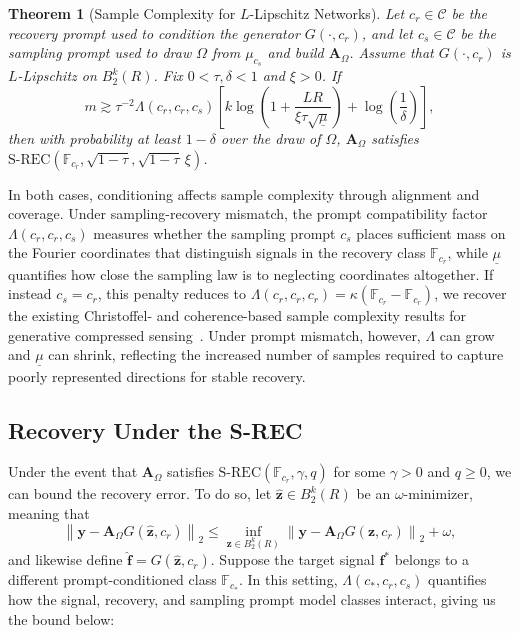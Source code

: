 \documentclass{article}
\theoremstyle{plain}
\newtheorem{theorem}{Theorem}[section]
\theoremstyle{definition}
\theoremstyle{remark}
\begin{document}
\begin{theorem}[Sample Complexity for $L$-Lipschitz Networks]
  \label{thm:lipschitz-srec}
  Let $c_r\in\mathcal C$ be the recovery prompt used to condition the generator $G(\cdot, c_r)$, and let $c_s\in\mathcal C$ be the sampling prompt used to draw $\Omega$ from $\mu_{c_s}$ and build $\mathbf A_\Omega$.
  Assume that $G\left(\cdot,c_r\right)$ is $L$-Lipschitz on $B_2^k\left(R\right)$. Fix $0<\tau,\delta<1$ and $\xi>0$. If
  \[
    m
    \gtrsim
    \tau^{-2}
    \Lambda\left(c_r,c_r,c_s\right)
    \left[
      k\log\left(
        1+
        \frac{LR}
        {\xi\tau\sqrt{\underline{\mu}}}
      \right)
      +
      \log\left(\frac{1}{\delta}\right)
    \right],
  \]
  then with probability at least $1-\delta$ over the draw of $\Omega$, $\mathbf A_\Omega$ satisfies
  $
  \mathrm{S\text{-}REC}
  \left(
    \mathbb{F}_{c_r},
    \sqrt{1-\tau},
    \sqrt{1-\tau}\,\xi
  \right)
  $.
\end{theorem}

In both cases, conditioning affects sample complexity through alignment and coverage. Under sampling-recovery mismatch, the prompt compatibility factor $\Lambda(c_r,c_r,c_s)$ measures whether the sampling prompt $c_s$ places sufficient mass on the Fourier coordinates that distinguish signals in the recovery class $\mathbb F_{c_r}$, while $\underline{\mu}$ quantifies how close the sampling law is to neglecting coordinates altogether. If instead $c_s=c_r$, this penalty reduces to $\Lambda(c_r,c_r,c_r)=\kappa(\mathbb F_{c_r}-\mathbb F_{c_r})$, we recover the existing Christoffel- and coherence-based sample complexity results for generative compressed sensing~\cite{adcock2023cs4ml, berk2023modeladapted, plan2025denoising}. Under prompt mismatch, however, $\Lambda$ can grow and $\underline{\mu}$ can shrink, reflecting the increased number of samples required to capture poorly represented directions for stable recovery.


\subsection{Recovery Under the S-REC}\label{subsec:recovery}
Under the event that $\mathbf A_\Omega$ satisfies
$\mathrm{S\text{-}REC}\left(\mathbb{F}_{c_r},\gamma,q\right)$
for some $\gamma>0$ and $q\geq 0$, we can bound the recovery error. To do so, let $\widehat{\mathbf z}\in B_2^k(R)$ be an $\omega$-minimizer, meaning that
\begin{equation}\label{eq: omega minimizer}
  \left\|
  \mathbf y
  -
  \mathbf A_\Omega G\left(\widehat{\mathbf z},c_r\right)
  \right\|_2
  \le
  \inf_{\mathbf z\in B_2^k(R)}
  \left\|
  \mathbf y
  -
  \mathbf A_\Omega G\left(\mathbf z,c_r\right)
  \right\|_2
  +
  \omega,
\end{equation}
and likewise define $\widehat{\mathbf f}=G\left(\widehat{\mathbf z},c_r\right)$. Suppose the target signal $\mathbf f^*$ belongs to a different prompt-conditioned class $\mathbb F_{c_*}$. In this setting, $\Lambda(c_*,c_r,c_s)$ quantifies how the signal, recovery, and sampling prompt model classes interact, giving us the bound below:
\end{document}
